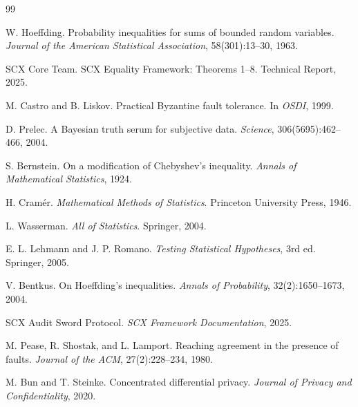 \documentclass[11pt,a4paper]{article}
\theoremstyle{definition}
\begin{document}
\begin{thebibliography}{99}

W. Hoeffding.
\newblock Probability inequalities for sums of bounded random variables.
\newblock \textit{Journal of the American Statistical Association}, 58(301):13--30, 1963.

SCX Core Team.
\newblock SCX Equality Framework: Theorems 1--8.
\newblock Technical Report, 2025.

M. Castro and B. Liskov.
\newblock Practical Byzantine fault tolerance.
\newblock In \textit{OSDI}, 1999.

D. Prelec.
\newblock A Bayesian truth serum for subjective data.
\newblock \textit{Science}, 306(5695):462--466, 2004.

S. Bernstein.
\newblock On a modification of Chebyshev's inequality.
\newblock \textit{Annals of Mathematical Statistics}, 1924.

H. Cram\'{e}r.
\newblock \textit{Mathematical Methods of Statistics}.
\newblock Princeton University Press, 1946.

L. Wasserman.
\newblock \textit{All of Statistics}.
\newblock Springer, 2004.

E. L. Lehmann and J. P. Romano.
\newblock \textit{Testing Statistical Hypotheses}, 3rd ed.
\newblock Springer, 2005.

V. Bentkus.
\newblock On Hoeffding's inequalities.
\newblock \textit{Annals of Probability}, 32(2):1650--1673, 2004.

SCX Audit Sword Protocol.
\newblock \textit{SCX Framework Documentation}, 2025.

M. Pease, R. Shostak, and L. Lamport.
\newblock Reaching agreement in the presence of faults.
\newblock \textit{Journal of the ACM}, 27(2):228--234, 1980.

M. Bun and T. Steinke.
\newblock Concentrated differential privacy.
\newblock \textit{Journal of Privacy and Confidentiality}, 2020.

\end{thebibliography}
\end{document}
